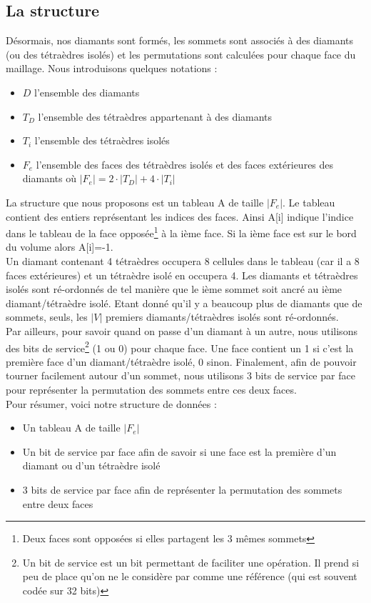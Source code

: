 \subsection{La structure}
\noindent
Désormais, nos diamants sont formés, les sommets sont associés à des diamants (ou des tétraèdres isolés) et les permutations sont calculées pour chaque face du maillage. Nous introduisons quelques notations :
\begin{itemize}
\item $D$ l'ensemble des diamants
\item $T_D$ l'ensemble des tétraèdres appartenant à des diamants
\item $T_i$ l'ensemble des tétraèdres isolés
\item $F_e$ l'ensemble des faces des tétraèdres isolés et des faces extérieures des diamants où $|F_e|=2\cdot |T_D|+4\cdot |T_i|$\\
\end{itemize}
\noindent
La structure que nous proposons est un tableau A de taille $|F_e|$. Le tableau contient des entiers représentant les indices des faces. Ainsi A[i] indique l'indice dans le tableau de la face opposée\footnote{Deux faces sont opposées si elles partagent les 3 mêmes sommets} à la ième face. Si la ième face est sur le bord du volume alors A[i]=-1.\\ 
Un diamant contenant 4 tétraèdres occupera 8 cellules dans le tableau (car il a 8 faces extérieures) et un tétraèdre isolé en occupera 4. Les diamants et tétraèdres isolés sont ré-ordonnés de tel manière que le ième sommet soit ancré au ième diamant/tétraèdre isolé. Etant donné qu'il y a beaucoup plus de diamants que de sommets, seuls, les $|V|$ premiers diamants/tétraèdres isolés sont ré-ordonnés.\\
Par ailleurs, pour savoir quand on passe d'un diamant à un autre, nous utilisons des bits de service\footnote{Un bit de service est un bit permettant de faciliter une opération. Il prend si peu de place qu'on ne le considère par comme une référence (qui est souvent codée sur 32 bits)} (1 ou 0) pour chaque face. Une face contient un 1 si c'est la première face d'un diamant/tétraèdre isolé, 0 sinon. Finalement, afin de pouvoir tourner facilement autour d'un sommet, nous utilisons 3 bits de service par face pour représenter la permutation des sommets entre ces deux faces.\\
Pour résumer, voici notre structure de données :
\begin{itemize}
\item Un tableau A de taille $|F_e|$
\item Un bit de service par face afin de savoir si une face est la première d'un diamant ou d'un tétraèdre isolé
\item 3 bits de service par face afin de représenter la permutation des sommets entre deux faces
\end{itemize}
